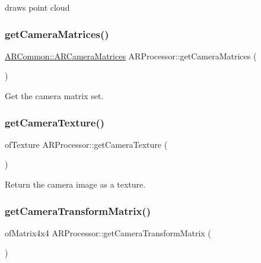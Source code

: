draws point cloud 

\mbox{\label{class_a_r_processor_a82a9b334360ebccd844e7cf5584eff8b}} 
\subsubsection{\texorpdfstring{get\+Camera\+Matrices()}{getCameraMatrices()}}
{\footnotesize\ttfamily \hyperlink{struct_a_r_common_1_1_a_r_camera_matrices}{A\+R\+Common\+::\+A\+R\+Camera\+Matrices} A\+R\+Processor\+::get\+Camera\+Matrices (\begin{DoxyParamCaption}{ }\end{DoxyParamCaption})\hspace{0.3cm}{\ttfamily [inline]}}



Get the camera matrix set. 

\mbox{\label{class_a_r_processor_a5eb8045000bc6e0ad3d41d7bbf832047}} 
\subsubsection{\texorpdfstring{get\+Camera\+Texture()}{getCameraTexture()}}
{\footnotesize\ttfamily of\+Texture A\+R\+Processor\+::get\+Camera\+Texture (\begin{DoxyParamCaption}{ }\end{DoxyParamCaption})\hspace{0.3cm}{\ttfamily [inline]}}



Return the camera image as a texture. 

\mbox{\label{class_a_r_processor_aea093b6d054daa0c75de6f7a492a19ff}} 
\subsubsection{\texorpdfstring{get\+Camera\+Transform\+Matrix()}{getCameraTransformMatrix()}}
{\footnotesize\ttfamily of\+Matrix4x4 A\+R\+Processor\+::get\+Camera\+Transform\+Matrix (\begin{DoxyParamCaption}{ }\end{DoxyParamCaption})\hspace{0.3cm}{\ttfamily [inline]}}



